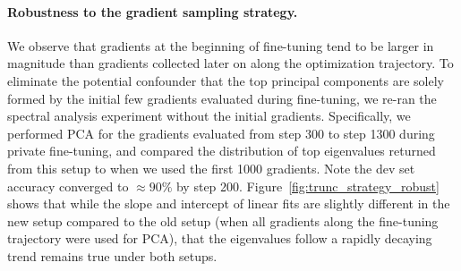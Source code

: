 \paragraph{Robustness to the gradient sampling strategy.}
We observe that gradients at the beginning of fine-tuning tend to be larger in magnitude than gradients collected later on along the optimization trajectory.
To eliminate the potential confounder that the top principal components are solely formed by the initial few gradients evaluated during fine-tuning, we re-ran the spectral analysis experiment without the initial gradients.
Specifically, we performed PCA for the gradients evaluated from step 300 to step 1300 during private fine-tuning, and compared the distribution of top eigenvalues returned from this setup to when we used the first 1000 gradients.
Note the dev set accuracy converged to $\approx 90\%$ by step 200. 
Figure~\ref{fig:trunc_strategy_robust} shows that while the slope and intercept of linear fits are slightly different in the new setup compared to the old setup (when all gradients along the fine-tuning trajectory were used for PCA), that the eigenvalues follow a rapidly decaying trend remains true under both setups.

